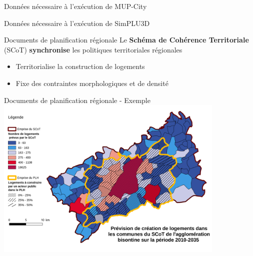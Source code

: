 \documentclass[xcolor=table]{beamer}
\begin{document}
\begin{frame}{Données nécessaire à l'exécution de MUP-City}
\end{frame}
\begin{frame}{Données nécessaire à l'exécution de SimPLU3D}
\end{frame}



\begin{frame}{Documents de planification régionale}
Le \textbf{Schéma de Cohérence Territoriale} (SCoT) \textbf{synchronise} les politiques territoriales régionales
\begin{itemize}
	\item Territorialise la construction de logements
	\item Fixe des contraintes morphologiques et de densité
\end{itemize}
\end{frame}

\begin{frame}{Documents de planification régionale - Exemple}
\includegraphics[width=11cm]{cartes/prevision-plh.png}
\end{frame}
\end{document}
